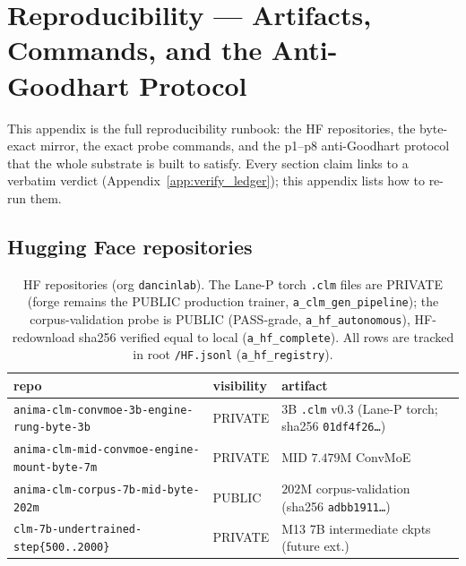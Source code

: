 \section{Reproducibility --- Artifacts, Commands, and the Anti-Goodhart Protocol}
\label{app:repro}

This appendix is the full reproducibility runbook: the HF repositories, the
byte-exact mirror, the exact probe commands, and the p1--p8 anti-Goodhart
protocol that the whole substrate is built to satisfy. Every section claim links
to a verbatim verdict (Appendix~\ref{app:verify_ledger}); this appendix lists how
to re-run them.

\subsection{Hugging Face repositories}
\label{app:repro-hf}

\begin{table}[h]
\centering
\footnotesize
\setlength{\tabcolsep}{5pt}
\begin{tabular}{@{}l l l@{}}
\toprule
\textbf{repo} & \textbf{visibility} & \textbf{artifact} \\
\midrule
\texttt{anima-clm-convmoe-3b-engine-rung-byte-3b} & PRIVATE & 3B \texttt{.clm} v0.3 (Lane-P torch; sha256 \texttt{01df4f26\dots}) \\
\texttt{anima-clm-mid-convmoe-engine-mount-byte-7m} & PRIVATE & MID $7.479$M ConvMoE \\
\texttt{anima-clm-corpus-7b-mid-byte-202m} & PUBLIC & $202$M corpus-validation (sha256 \texttt{adbb1911\dots}) \\
\texttt{clm-7b-undertrained-step\{500..2000\}} & PRIVATE & M13 7B intermediate ckpts (future ext.) \\
\bottomrule
\end{tabular}
\caption{HF repositories (org \texttt{dancinlab}). The Lane-P torch \texttt{.clm}
files are PRIVATE (forge remains the PUBLIC production trainer,
\texttt{a\_clm\_gen\_pipeline}); the corpus-validation probe is PUBLIC
(PASS-grade, \texttt{a\_hf\_autonomous}), HF-redownload sha256 verified equal to
local (\texttt{a\_hf\_complete}). All rows are tracked in root \texttt{/HF.jsonl}
(\texttt{a\_hf\_registry}).}
\label{tab:repro-hf}
\end{table}

